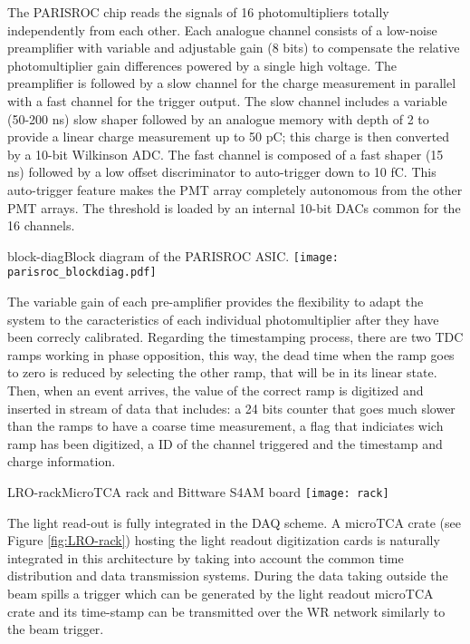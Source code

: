 The PARISROC chip reads the signals of 16 photomultipliers totally independently from each
other. Each analogue channel consists of a low-noise preamplifier with variable and adjustable
gain (8 bits) to compensate the relative photomultiplier gain differences powered by a single high
voltage. The preamplifier is followed by a slow channel for the charge measurement in parallel
with a fast channel for the trigger output. The slow channel includes a variable (50-200 ns) slow
shaper followed by an analogue memory with depth of 2 to provide a linear charge measurement
up to 50 pC; this charge is then converted by a 10-bit Wilkinson ADC. The fast channel is
composed of a fast shaper (15 ns) followed by a low offset discriminator to auto-trigger down to
10 fC. This auto-trigger feature makes the PMT array completely autonomous from the other
PMT arrays. The threshold is loaded by an internal 10-bit DACs common for the 16 channels.


\begin{cdrfigure}{block-diag}{Block diagram of the PARISROC ASIC.}
 \texttt{[image: parisroc\_blockdiag.pdf]}  
\end{cdrfigure}


The variable gain of each pre-amplifier provides the flexibility to adapt the system to the caracteristics of each individual photomultiplier after they have been correcly calibrated. Regarding the timestamping process, there are two TDC ramps working in phase opposition, this way, the dead time when the ramp goes to zero is reduced by selecting the other ramp, that will be in its linear state. Then, when an event arrives, the value of the correct ramp is digitized and inserted in stream of data that includes: a 24 bits counter that goes much slower than the ramps to have a coarse time measurement, a flag that indiciates wich ramp has been digitized, a ID of the channel triggered and the timestamp and charge information.

\begin{cdrfigure}{LRO-rack}{MicroTCA rack and Bittware S4AM board}
 \texttt{[image: rack]}  
\end{cdrfigure}

The light read-out is fully integrated in the DAQ scheme. A microTCA crate (see Figure \ref{fig:LRO-rack}) hosting the light readout digitization cards is naturally integrated in this architecture by taking into account the common time distribution and data transmission systems.  During the data taking outside the beam spills a trigger which can be generated by the light readout microTCA crate and its time-stamp can be transmitted over the WR network similarly to the beam trigger. 


